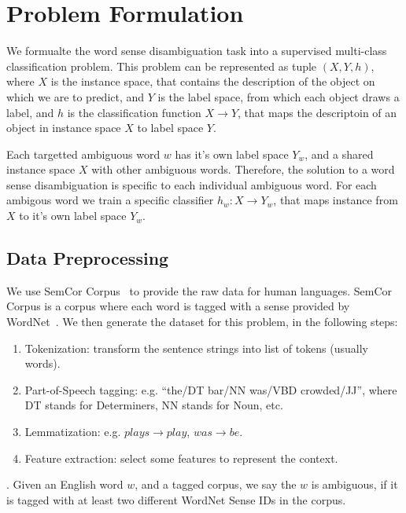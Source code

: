 \section{Problem Formulation}

We formualte the word sense disambiguation task into a supervised multi-class
classification problem.
This problem can be represented as tuple $(X,Y,h)$, where $X$ is the instance
space, that contains the description of the object on which we are to predict, 
and $Y$ is the label space, from which each object draws a label,
and $h$ is the classification function $X \rightarrow Y$, that maps the
descriptoin of an object in instance space $X$ to label space $Y$.

Each targetted ambiguous word $w$ has it's own label space $Y_w$, and a shared
instance space $X$ with other ambiguous words.
Therefore, the solution to a word sense disambiguation is specific to each
individual ambiguous word.
For each ambigous word we train a specific classifier $h_w: X
\rightarrow Y_w$, that maps instance from $X$ to it's own label space $Y_w$.


\subsection{Data Preprocessing}
\label{sec:formulate:preprocess}

We use SemCor Corpus~\cite{semcor} to provide the raw data for human languages.
SemCor Corpus is a corpus where each word is tagged with a sense provided by
WordNet~\cite{wordnet}.
We then generate the dataset for this problem, in the following steps:

\begin{enumerate}
  \item Tokenization: transform the sentence strings into list of tokens
    (usually words).
  \item Part-of-Speech tagging: e.g. ``the/DT bar/NN was/VBD crowded/JJ'', where
    DT stands for Determiners, NN stands for Noun, etc.
  \item Lemmatization: e.g. $plays \rightarrow play$, $was \rightarrow be$.
  \item Feature extraction: select some features to represent the context.
\end{enumerate}

. 
Given an English word $w$, and a tagged corpus, we say the $w$ is ambiguous, if
it is tagged with at least two different WordNet Sense IDs in the corpus.

